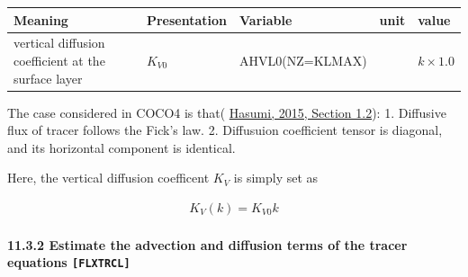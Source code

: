 \setlength\LTleft{0pt}\setlength\LTright{0pt}\begin{longtable}[]{@{}lllll@{}}
\toprule\relax
\begin{minipage}[b]{0.43\columnwidth}\raggedright
Meaning\strut
\end{minipage} & \begin{minipage}[b]{0.11\columnwidth}\raggedright
Presentation\strut
\end{minipage} & \begin{minipage}[b]{0.14\columnwidth}\raggedright
Variable\strut
\end{minipage} & \begin{minipage}[b]{0.05\columnwidth}\raggedright
unit\strut
\end{minipage} & \begin{minipage}[b]{0.12\columnwidth}\raggedright
value\strut
\end{minipage}\tabularnewline
\midrule\relax
\endhead
\begin{minipage}[t]{0.43\columnwidth}\raggedright
vertical diffusion coefficient at the surface layer\strut
\end{minipage} & \begin{minipage}[t]{0.11\columnwidth}\raggedright
\(K_{V0}\)\strut
\end{minipage} & \begin{minipage}[t]{0.14\columnwidth}\raggedright
AHVL0(NZ=KLMAX)\strut
\end{minipage} & \begin{minipage}[t]{0.05\columnwidth}\raggedright
\strut
\end{minipage} & \begin{minipage}[t]{0.12\columnwidth}\raggedright
\(k\times 1.0\)\strut
\end{minipage}\tabularnewline
\bottomrule
\end{longtable}

The case considered in COCO4 is that(
\href{https://ccsr.aori.u-tokyo.ac.jp/~hasumi/COCO/coco4.pdf}{Hasumi,
2015, Section 1.2}): 1. Diffusive flux of tracer follows the Fick's law.
2. Diffusuion coefficient tensor is diagonal, and its horizontal
component is identical.

Here, the vertical diffusion coefficent \(K_V\) is simply set as

\begin{eqnarray}
    K_V(k) = K_{V0} k
\end{eqnarray}

\hypertarget{estimate-the-advection-and-diffusion-terms-of-the-tracer-equations-flxtrcl}{%
\paragraph{\texorpdfstring{11.3.2 Estimate the advection and diffusion
terms of the tracer equations
\texttt{{[}FLXTRCL{]}}}{11.3.2 Estimate the advection and diffusion terms of the tracer equations {[}FLXTRCL{]}}}\label{estimate-the-advection-and-diffusion-terms-of-the-tracer-equations-flxtrcl}}

